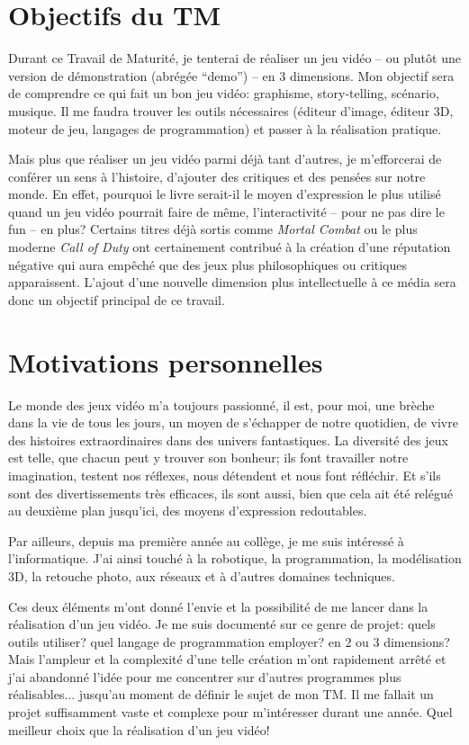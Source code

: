 \printMiniToc


\section{Objectifs du TM}
\label{sec:objectifsTM}
Durant ce Travail de Maturité, je tenterai de réaliser un  jeu vidéo -- ou plutôt une version de démonstration (abrégée \enquote{demo}) -- en 3 dimensions. Mon objectif sera de comprendre ce qui fait un bon jeu vidéo: graphisme, story-telling, scénario, musique. Il me faudra trouver les outils nécessaires (éditeur d'image, éditeur 3D, moteur de jeu, langages de programmation) et passer à la réalisation pratique.

Mais plus que réaliser un jeu vidéo parmi déjà tant d'autres, je m'efforcerai de conférer un sens à l'histoire, d'ajouter des critiques et des pensées sur notre monde. En effet, pourquoi le livre serait-il le moyen d'expression le plus utilisé quand un jeu vidéo pourrait faire de même, l'interactivité -- pour ne pas dire le fun -- en plus? Certains titres déjà sortis comme \textit{Mortal Combat} ou le plus moderne \textit{Call of Duty} ont certainement contribué à la création d'une réputation négative qui aura empêché que des jeux plus philosophiques ou critiques apparaissent. L'ajout d'une nouvelle dimension plus intellectuelle à ce média sera donc un objectif principal de ce travail.



\section{Motivations personnelles}
Le monde des jeux vidéo m'a toujours passionné, il est, pour moi, une brèche dans la vie de tous les jours, un moyen de s'échapper de notre quotidien, de vivre des histoires extraordinaires dans des univers fantastiques. La diversité des jeux est telle, que chacun peut y trouver son bonheur; ils font travailler notre imagination, testent nos réflexes, nous détendent et nous font réfléchir. Et s'ils sont des divertissements très efficaces, ils sont aussi, bien que cela ait été relégué au deuxième plan jusqu'ici, des moyens d'expression redoutables.

Par ailleurs, depuis ma première année au collège, je me suis intéressé à l'informatique. J'ai ainsi touché à la robotique, la programmation, la modélisation 3D, la retouche photo, aux réseaux et à d'autres domaines techniques.

Ces deux éléments m'ont donné l'envie et la possibilité de me lancer dans la réalisation d'un jeu vidéo. Je me suis documenté sur ce genre de projet: quels outils utiliser? quel langage de programmation employer? en 2 ou 3 dimensions? Mais l'ampleur et la complexité d'une telle création m'ont rapidement arrêté et j'ai abandonné l'idée pour me concentrer sur d'autres programmes plus réalisables... jusqu'au moment de définir le sujet de mon TM. Il me fallait un projet suffisamment vaste et complexe pour m'intéresser durant une année. Quel meilleur choix que la réalisation d'un jeu vidéo!



